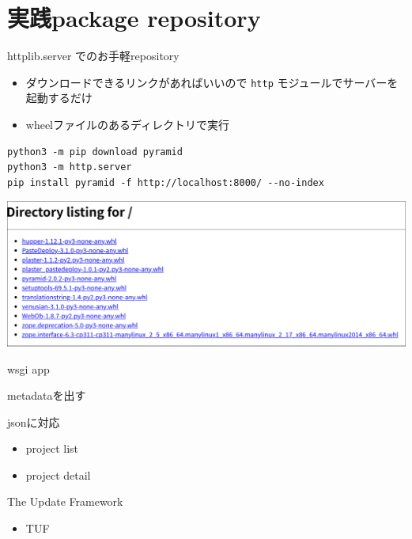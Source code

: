 \documentclass[presentation]{beamer}
\begin{document}
\section{実践package repository}
\label{sec:org004cfac}
\begin{frame}[label={sec:orgc36659c},fragile]{httplib.server でのお手軽repository}
 \begin{itemize}
\item ダウンロードできるリンクがあればいいので \texttt{http} モジュールでサーバーを起動するだけ
\item wheelファイルのあるディレクトリで実行
\end{itemize}

\begin{verbatim}
python3 -m pip download pyramid
python3 -m http.server
pip install pyramid -f http://localhost:8000/ --no-index
\end{verbatim}

\begin{center}
\includegraphics[width=.9\linewidth]{./http-server-simple-repository.png}
\end{center}
\end{frame}

\begin{frame}[label={sec:orgb915b43}]{wsgi app}
\end{frame}
\begin{frame}[label={sec:orgcf2d380}]{metadataを出す}
\end{frame}
\begin{frame}[label={sec:orgb4db4a9}]{jsonに対応}
\begin{itemize}
\item project list
\item project detail
\end{itemize}
\end{frame}
\begin{frame}[label={sec:org5dbba5e}]{The Update Framework}
\begin{itemize}
\item TUF
\end{itemize}
\end{frame}
\end{document}
